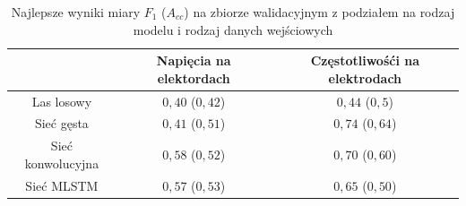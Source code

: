 \documentclass{./assets/wfis}
\begin{document}

\begin{table}[h]
    \centering
    \begin{tabular}{|c|c|c|}
        \hline
                 & Napięcia na elektordach & Częstotliwośći na elektrodach  \\
        \hline
        Las losowy & $0,40$ ($0,42$) & $0,44$ ($0,5$) \\
        Sieć gęsta  &$0,41$ ($0,51$)  & $0,74$ ($0,64$) \\
        Sieć konwolucyjna & $0,58$ ($0,52$) & $0,70$ ($0,60$) \\
        Sieć MLSTM & $0,57$ ($0,53$) & $0,65$ ($0,50$) \\
        \hline
    \end{tabular}
    \caption{Najlepsze wyniki miary $F_1$ ($A_{cc}$) na zbiorze walidacyjnym z podziałem na rodzaj modelu i rodzaj danych wejściowych}
    \label{tab:high-level-results}
\end{table}
\end{document}
